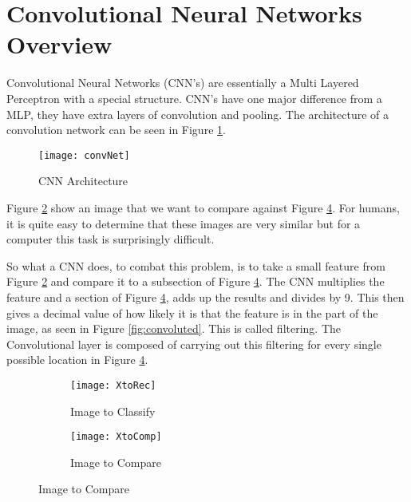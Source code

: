 \section{Convolutional Neural Networks Overview}
Convolutional Neural Networks (CNN's) are essentially a Multi Layered Perceptron with a
special structure. CNN's have one major difference from a MLP, they have extra
layers of convolution and pooling. The architecture of a convolution network can
be seen in Figure \ref{fig:convNet}.

\begin{figure}
	\texttt{[image: convNet]}
	\caption{CNN Architecture}
	\label{fig:convNet}
\end{figure}

Figure \ref{fig:XtoRec} show an image that we want to compare against
Figure \ref{fig:XtoComp}.
For humans, it is quite easy to determine that these images are very similar but
for a computer this task is surprisingly difficult.

So what a CNN does, to combat this problem, is to take a small feature from
Figure \ref{fig:XtoRec} and compare it to a subsection of Figure \ref{fig:XtoComp}.
The CNN multiplies the feature and a section of Figure \ref{fig:XtoComp}, adds
up the results and divides by 9. This then gives a decimal value of how likely
it is that the feature is in the part of the image, as seen in Figure
\ref{fig:convoluted}.
This is called filtering. The Convolutional layer is composed of carrying out
this filtering for every single possible location in Figure \ref{fig:XtoComp}.
\begin{figure}
	\caption{Image filtering}
    \label{fig:filter}
      \begin{subfigure}[b]{0.4\textwidth}
          \texttt{[image: XtoRec]}
          \caption{Image to Classify}
          \label{fig:XtoRec}
      \end{subfigure}
      \begin{subfigure}[b]{0.4\textwidth}
      \texttt{[image: XtoComp]}
      \caption{Image to Compare}
      \label{fig:XtoComp}
      \end{subfigure}
\end{figure}

